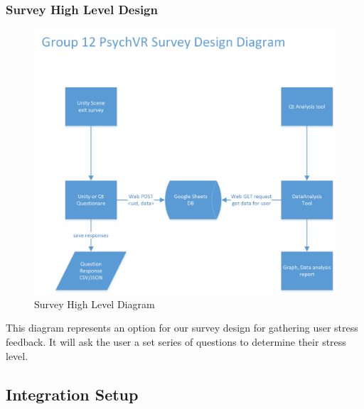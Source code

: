 \documentclass[a4paper,10pt]{article}
\begin{document}
		\subsubsection{Survey High Level Design}
			\begin{figure}[H]
					\centerline{\includegraphics[]{survey.png}}
					\caption{Survey High Level Diagram}
					\label{fig:surveyDiag}
				\end{figure}
				This diagram represents an option for our survey design for gathering user stress feedback. It will ask the user a set series of questions to determine their stress level.
\pagebreak
\subsection{Integration Setup}
\end{document}
